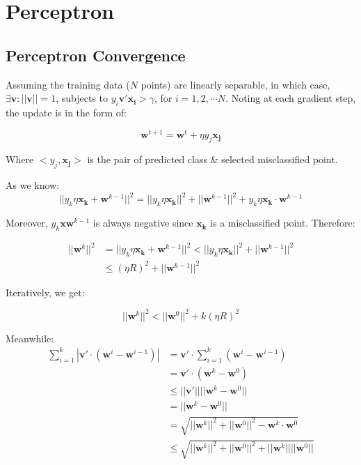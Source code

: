 \documentclass{article}
\newcommand{\V}[1]{\boldsymbol{#1}}
\begin{document}
\section{Perceptron}
\subsection{Perceptron Convergence}
Assuming the training data (\(N\) points) are linearly separable, in which case, 
\(\exists \V{v}: ||\V{v}||=1\), subjects to \(y_i\V{v'}\V{x_i}>\gamma\), for
\(i=1, 2, \cdots N\).
Noting at each gradient step, the update is in the form of:

\begin{equation}
\V{w}^{t+1}=\V{w}^t+\eta y_j\V{x_j}
\end{equation}

Where \(<y_j, \V{x_j}>\) is the pair of predicted class \& selected misclassified point.

As we know:
\begin{equation}
||y_k\eta\V{x_k} +\V{w}^{k-1}||^2=||y_k\eta\V{x_k}||^2+||\V{w}^{k-1}||^2+y_k\eta\V{x_k}\cdot \V{w}^{k-1}
\end{equation}

Moreover, \(y_k\V{x}\V{w}^{k-1}\) is always negative since \(\V{x_k}\) is a
misclassified point. Therefore:

\begin{equation}
\begin{aligned}
||\V{w}^k||^2&=||y_k\eta\V{x_k} +\V{w}^{k-1}||^2<||y_k\eta \V{x_k}||^2+||\V{w}^{k-1}||^2\\
&\leq (\eta R)^2 + ||\V{w}^{k-1}||^2
\end{aligned}
\end{equation}

Iteratively, we get:

\begin{equation}
||\V{w}^k||^2<||\V{w}^0||^2+k(\eta R)^2
\end{equation}

Meanwhile:
\begin{equation}
\begin{aligned}
\sum_{i=1}^k|\V{v'}\cdot (\V{w}^i-\V{w}^{i-1})|&=\V{v'}\cdot\sum_{i=1}^k(\V{w}^i-\V{w}^{i-1})\\
&=\V{v'}\cdot (\V{w}^k-\V{w}^0)\\
&\leq ||\V{v'}||||\V{w}^k-\V{w}^0||\\
&=||\V{w}^k-\V{w}^0||\\
&= \sqrt{||\V{w}^k||^2 + ||\V{w}^0||^2 - \V{w}^k \cdot \V{w}^0}\\
&\leq \sqrt{||\V{w}^k||^2+||\V{w}^0||^2+||\V{w}^k||||\V{w}^0||}
\end{aligned}
\end{equation}
\end{document}
